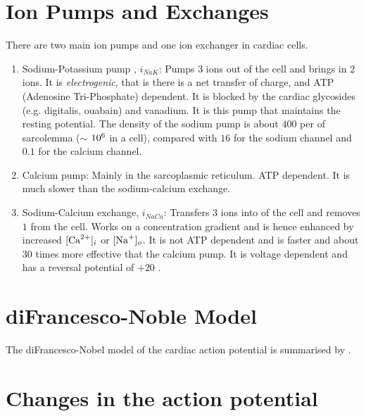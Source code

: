 \section{Ion Pumps and Exchanges}

There are two main ion pumps and one ion exchanger in cardiac cells.
\begin{enumerate}
\item Sodium-Potassium pump , $i_{NaK}$: Pumps $3$  ions out of the
  cell and brings in $2$  ions. It is \emph{electrogenic}, that is
  there is a net transfer of charge, and ATP (Adenosine Tri-Phosphate)
  dependent. It is blocked by the cardiac glycosides (e.g. digitalis, ouabain)
  and vanadium. It is this pump that maintains the resting potential. The
  density of the sodium pump is about $400$ per  of sarcolemma
  ($\sim$ $ 10^{6} $ in a cell), compared with $16$ for the sodium channel
  and $0.1$ for the calcium channel.
\item Calcium pump: Mainly in the sarcoplasmic reticulum. ATP dependent. It
  is much slower than the sodium-calcium exchange.
\item Sodium-Calcium exchange, $i_{NaCa}$: Transfers $3$  ions into
  of the cell and removes $1$  from the cell. Works on a
  concentration gradient and is hence enhanced by increased
  $ [\mathrm{\mathrm{{Ca}^{2+}}}]_{i} $ or $ [\mathrm{\mathrm{{Na}^{+}}}]_{o} $. It is not ATP dependent
  and is faster and about $30$ times more effective that the calcium pump. It is
  voltage dependent and has a reversal potential of $+20$ \mV.
\end{enumerate}

\section{diFrancesco-Noble Model}

The diFrancesco-Nobel model of the cardiac action potential is summarised
by .


\section{Changes in the action potential}

